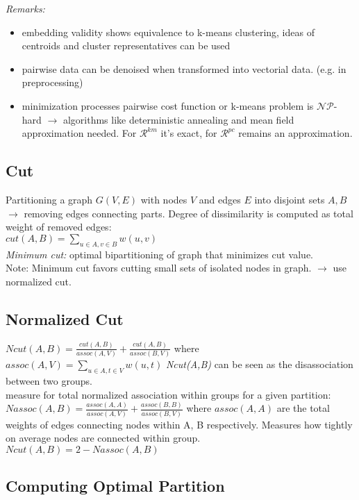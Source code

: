 \documentclass[9pt,parskip]{scrartcl}
\begin{document}
\begin{multicols*}{4}
\textit{Remarks:}
\begin{itemize}
	\item embedding validity shows equivalence to k-means clustering, ideas of centroids and cluster representatives can be used
	\item pairwise data can be denoised when transformed into vectorial data. (e.g. in preprocessing)
	\item minimization processes pairwise cost function or k-means problem is $\mathcal{N}\mathcal{P}$-hard $\to$ algorithms like deterministic annealing and mean field approximation needed. For $\mathcal{R}^{km}$ it's exact, for $\mathcal{R}^{pc}$ remains an approximation.
\end{itemize}

\subsection*{Cut}
Partitioning a graph $G(V,E)$ with nodes $V$ and edges $E$ into disjoint sets $A,B$ $\to$ removing edges connecting parts. Degree of dissimilarity is computed as total weight of removed edges: \\
$cut(A,B) = \sum_{u \in A, v \in B} w(u,v)$ \\
\textit{Minimum cut: } optimal bipartitioning of graph that minimizes cut value. \\
Note: Minimum cut favors cutting small sets of isolated nodes in graph. $\to $ use normalized cut.
\subsection*{Normalized Cut}
$Ncut(A,B) = \frac{cut(A,B)}{assoc(A,V)} + \frac{cut(A,B)}{assoc(B,V)}$ where $assoc(A,V) = \sum_{u \in A, t \in V} w(u,t) $
\textit{Ncut(A,B)} can be seen as the disassociation between two groups. \\
 measure for total
normalized association within groups for a given partition:\\
$Nassoc(A,B) = \frac{assoc(A,A)}{assoc(A,V)} + \frac{assoc(B,B)}{assoc(B,V)}$ where $assoc(A,A) $ are the total weights of edges connecting nodes within A, B respectively. Measures how tightly on average nodes are connected within group. \\
$Ncut(A,B) = 2 - Nassoc(A,B)$ \\
\subsection*{Computing Optimal Partition}


\end{multicols*}
\end{document}
